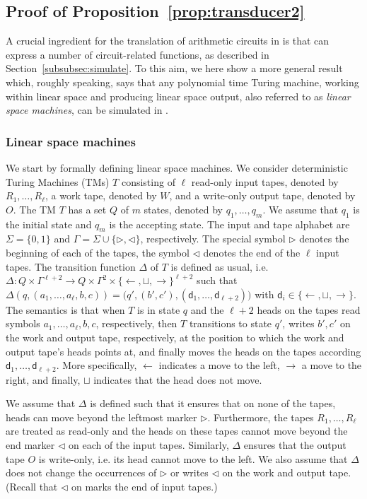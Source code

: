 \subsection{Proof of Proposition~\ref{prop:transducer2}}
A crucial ingredient for the translation of arithmetic circuits in \langfor is that \langfor
can express a number of circuit-related functions, as described in Section~\ref{subsubsec:simulate}.
To this aim, we here show a more general result which, roughly speaking, says that any 
polynomial time Turing machine, working within linear space and producing linear space output, also
referred to as \textit{linear space machines}, 
can be simulated in \langfor. 


\subsubsection{Linear space machines}\label{subsubsec:linearspace}
We start by formally defining linear space machines. We consider  deterministic Turing Machines (TMs) $T$ 
consisting of $\ell$ read-only input tapes, denoted by $R_1,\ldots,R_\ell$,
a work tape, denoted by $W$, and a write-only output tape, denoted by $O$. The TM $T$ has a set 
$Q$ of $m$ states, denoted by $q_1,\ldots,q_m$. We assume that $q_1$ is the initial state and $q_m$ is the accepting state.
The input and tape alphabet are $\Sigma=\{0,1\}$ and $\Gamma=\Sigma\cup\{\rhd,\lhd\}$, respectively. The special 
symbol $\rhd$ denotes the beginning of each of the tapes, the symbol $\lhd$ denotes the end of the $\ell$ input tapes. 
The transition function $\Delta$ of $T$ is defined as usual, i.e. 
$\Delta:Q\times \Gamma^{\ell+2} \to Q\times \Gamma^{2}\times \{\leftarrow,\sqcup,\rightarrow\}^{\ell+2}$ 
such that $\Delta(q,(a_1,\ldots,a_{\ell},b,c))=\bigl(q',(b',c'),(\mathsf{d}_1,\ldots,\mathsf{d}_{\ell+2})\bigr)$
with $\mathsf{d}_i\in \{\leftarrow,\sqcup,\rightarrow\}$. The semantics is that when $T$ is in state $q$ and the $\ell+2$ 
heads on the tapes read symbols $a_1,\ldots,a_{\ell},b,c$, respectively, then $T$ transitions to state $q'$,
writes $b',c'$ on the work and output tape, respectively, at the position to which the work and output 
tape's heads points at, and finally moves the heads on the tapes according 
$\mathsf{d}_1,\ldots,\mathsf{d}_{\ell+2}$. More specifically, $\leftarrow$  indicates a move to the left, 
$\rightarrow$ a move to the right, and finally, $\sqcup$ indicates that the head does not move.

We assume that $\Delta$ is defined such that it ensures that on none of the tapes, heads can move beyond 
the leftmost marker $\rhd$. Furthermore, the tapes $R_1,\ldots,R_\ell$ are treated as read-only and the heads 
on these tapes cannot move beyond the end marker $\lhd$ on each of the input tapes. Similarly, $\Delta$ ensures that the output tape $O$ 
is write-only, i.e. its head cannot move to the left.  We also assume that $\Delta$ does not change the 
occurrences of $\rhd$ or writes $\lhd$ on the work and output tape. (Recall that $\lhd$ on marks the end
of input tapes.)

